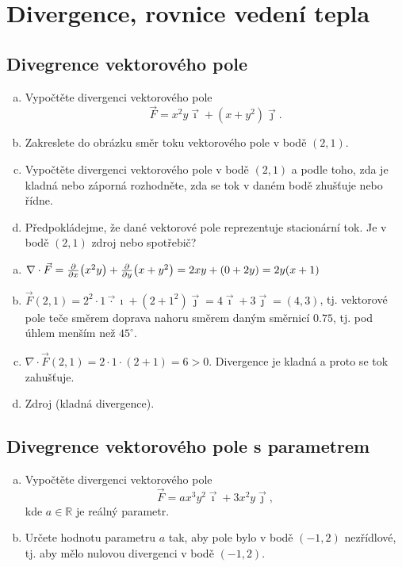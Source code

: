 \stranka
\section{Divergence, rovnice vedení tepla}


\subsection{Divegrence vektorového pole}

\begin{enumerate}[a)]
\item Vypočtěte divergenci vektorového pole
  $$\vec F=x^2y\vec \imath + (x+y^2)\vec \jmath.$$
\item Zakreslete do obrázku směr toku vektorového pole v bodě $(2,1)$. 
\item Vypočtěte divergenci vektorového pole v bodě $(2,1)$ a podle toho, zda je kladná nebo záporná rozhodněte, zda se tok v daném bodě zhušťuje nebo řídne.
\item Předpokládejme, že dané vektorové pole reprezentuje stacionární tok. Je v bodě $(2,1)$ zdroj nebo spotřebič?
\end{enumerate}
\reseni

\begin{enumerate}[a)]
\item $\nabla \cdot \vec F=\pdv{x}(x^2y)+\pdv{y}(x+y^2)
=2xy+(0+2y)=2y(x+1)$
\item $\vec F(2,1)=2^2\cdot 1\vec \cdot \imath + (2+1^2)\vec \jmath=4\vec\imath+3\vec\jmath=(4,3)$, tj. vektorové pole teče směrem doprava nahoru směrem daným směrnicí $0.75$, tj. pod úhlem menším než $45^\circ$.
\item $\nabla\cdot\vec F(2,1)=2\cdot 1 \cdot(2+1)=6>0$. Divergence je kladná a proto se tok zahušťuje.
\item Zdroj (kladná divergence).
\end{enumerate}
\konec

\subsection{Divegrence vektorového pole s parametrem}

\begin{enumerate}[a)]
\item Vypočtěte divergenci vektorového pole
  $$\vec F=ax^3y^2\vec \imath + 3x^2y\vec \jmath,$$ kde
  $a\in\mathbb R$ je reálný parametr.
\item Určete hodnotu parametru $a$ tak, aby pole bylo v bodě $(-1,2)$ nezřídlové, tj. aby mělo nulovou divergenci v bodě $(-1,2)$.
\end{enumerate}
\reseni

